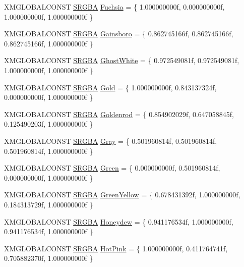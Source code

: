 \begin{DoxyCompactItemize}
X\+M\+G\+L\+O\+B\+A\+L\+C\+O\+N\+ST \hyperlink{structmage_1_1_s_r_g_b_a}{S\+R\+G\+BA} \hyperlink{namespacemage_1_1color_a5da168035660622308cc0dedb7a2c898}{Fuchsia} = \{ 1.\+000000000f, 0.\+000000000f, 1.\+000000000f, 1.\+000000000f \}
\item 
X\+M\+G\+L\+O\+B\+A\+L\+C\+O\+N\+ST \hyperlink{structmage_1_1_s_r_g_b_a}{S\+R\+G\+BA} \hyperlink{namespacemage_1_1color_ad0ca09c87e28accb063961a5a14c909f}{Gainsboro} = \{ 0.\+862745166f, 0.\+862745166f, 0.\+862745166f, 1.\+000000000f \}
\item 
X\+M\+G\+L\+O\+B\+A\+L\+C\+O\+N\+ST \hyperlink{structmage_1_1_s_r_g_b_a}{S\+R\+G\+BA} \hyperlink{namespacemage_1_1color_ae1c43e8ab59914b49570cacb857409cd}{Ghost\+White} = \{ 0.\+972549081f, 0.\+972549081f, 1.\+000000000f, 1.\+000000000f \}
\item 
X\+M\+G\+L\+O\+B\+A\+L\+C\+O\+N\+ST \hyperlink{structmage_1_1_s_r_g_b_a}{S\+R\+G\+BA} \hyperlink{namespacemage_1_1color_a2dd5e925822a435184cfac32f1f1e164}{Gold} = \{ 1.\+000000000f, 0.\+843137324f, 0.\+000000000f, 1.\+000000000f \}
\item 
X\+M\+G\+L\+O\+B\+A\+L\+C\+O\+N\+ST \hyperlink{structmage_1_1_s_r_g_b_a}{S\+R\+G\+BA} \hyperlink{namespacemage_1_1color_ae13828a6a1b0cc263b5a9bd822b559ff}{Goldenrod} = \{ 0.\+854902029f, 0.\+647058845f, 0.\+125490203f, 1.\+000000000f \}
\item 
X\+M\+G\+L\+O\+B\+A\+L\+C\+O\+N\+ST \hyperlink{structmage_1_1_s_r_g_b_a}{S\+R\+G\+BA} \hyperlink{namespacemage_1_1color_a66089b91c00c11fd66fdb6b957e18c6f}{Gray} = \{ 0.\+501960814f, 0.\+501960814f, 0.\+501960814f, 1.\+000000000f \}
\item 
X\+M\+G\+L\+O\+B\+A\+L\+C\+O\+N\+ST \hyperlink{structmage_1_1_s_r_g_b_a}{S\+R\+G\+BA} \hyperlink{namespacemage_1_1color_a48245bb6b463e921fdedd693650ea3ee}{Green} = \{ 0.\+000000000f, 0.\+501960814f, 0.\+000000000f, 1.\+000000000f \}
\item 
X\+M\+G\+L\+O\+B\+A\+L\+C\+O\+N\+ST \hyperlink{structmage_1_1_s_r_g_b_a}{S\+R\+G\+BA} \hyperlink{namespacemage_1_1color_a4158cbb67c02d4bf319e9dbfba31ad89}{Green\+Yellow} = \{ 0.\+678431392f, 1.\+000000000f, 0.\+184313729f, 1.\+000000000f \}
\item 
X\+M\+G\+L\+O\+B\+A\+L\+C\+O\+N\+ST \hyperlink{structmage_1_1_s_r_g_b_a}{S\+R\+G\+BA} \hyperlink{namespacemage_1_1color_ae1e6093bc57e79aebccc1c84672b5578}{Honeydew} = \{ 0.\+941176534f, 1.\+000000000f, 0.\+941176534f, 1.\+000000000f \}
\item 
X\+M\+G\+L\+O\+B\+A\+L\+C\+O\+N\+ST \hyperlink{structmage_1_1_s_r_g_b_a}{S\+R\+G\+BA} \hyperlink{namespacemage_1_1color_a808d0811878ca1e06f8ff11cfafdfd3a}{Hot\+Pink} = \{ 1.\+000000000f, 0.\+411764741f, 0.\+705882370f, 1.\+000000000f \}

\end{DoxyCompactItemize}
